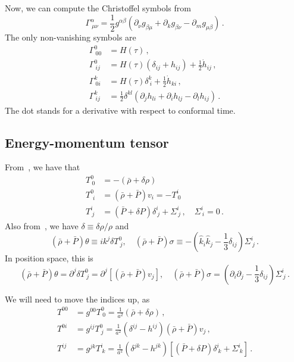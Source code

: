 Now, we can compute the Christoffel symbols from
\begin{equation}
    \Gamma^\alpha_{\ \mu \nu} = \frac{1}{2} g^{\alpha \beta}\left(\partial_\nu g_{\beta \mu}+\partial_k g_{\beta \nu}-\partial_m g_{\mu \beta}\right)\, .
\end{equation}The only non-vanishing symbols are
\begin{align}
    \Gamma^0_{\ 00} &= H(\tau)\, , \\
    \Gamma^0_{\ ij} &= H(\tau) \left(\delta_{i j}+h_{i j}\right) + \frac{1}{2}\dot{h}_{ij}\, , \\
    \Gamma^k_{\ 0i} &= H(\tau)\delta^k_{\ i} + \frac{1}{2}\dot{h}_{ki}\, ,\\
    \Gamma^{k}_{\ ij} &= \frac{1}{2} \delta^{kl}\left(\partial_j h_{li} + \partial_i h_{lj} - \partial_l h_{ij}\right)\, .
\end{align}
The dot stands for a derivative with respect to conformal time. 

\subsection{Energy-momentum tensor}
From~\cite{Ma1995}, we have that
\begin{align}
    T^0_{\ 0} & =-(\bar{\rho}+\delta \rho) \\
    T^0_{\ \, i} & =(\bar{\rho}+\bar{P}) v_i=-T^i_{\ 0} \\
    T^i_{\ j} & =(\bar{P}+\delta P) \delta^i_{\ j}+\Sigma^i_{\ j}\, , \quad \Sigma^i_{\ i}=0\, .
\end{align}Also from~\cite{Ma1995}, we have $\delta \equiv \delta\rho/\rho$ and
\begin{equation}
    (\bar{\rho}+\bar{P}) \theta \equiv i k^j \delta T^0_{\ j}, \quad(\bar{\rho}+\bar{P}) \sigma \equiv-\left(\hat{k}_i \hat{k}_j-\frac{1}{3} \delta_{i j}\right) \Sigma^i_{\ j}\, .
\end{equation}
In position space, this is
\begin{equation}
    (\bar{\rho}+\bar{P}) \theta = \partial^j \delta T^0_{\ j} = \partial^j\left[(\bar{\rho}+\bar{P}) v_j\right], \quad(\bar{\rho}+\bar{P}) \sigma = \left(\partial_i \partial_j-\frac{1}{3} \delta_{i j}\right) \Sigma^i_{\ j}\, .
\end{equation}

We will need to move the indices up, as
\begin{align}
    T^{00} &= g^{0 0}T^0_{\ 0} = \frac{1}{a^2}(\bar{\rho}+\delta\rho)\, , \\
    T^{0i} &= g^{ij}T^0_{\ j} = 
            \frac{1}{a^2}\left(\delta^{i j}-h^{i j}\right)(\bar{\rho}+\bar{P})v_j \, , \\
    T^{ij} &=  g^{jk}T^i_{\ k} = \frac{1}{a^2}\left(\delta^{jk}-h^{jk}\right)\left[(\bar{P}+\delta P)\delta^i_{\ k} + \Sigma^i_{\ k}\right]\, .
\end{align}

